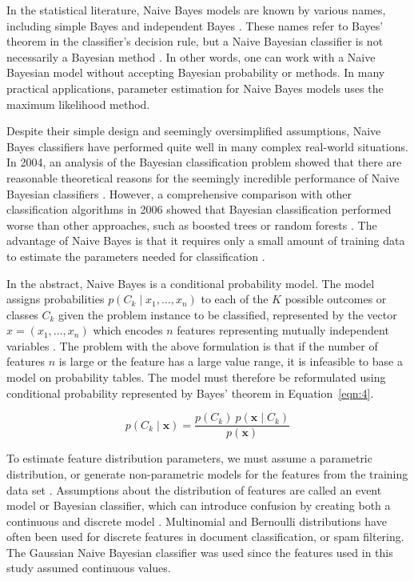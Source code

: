 \documentclass[sn-mathphys-num]{sn-jnl}%
\begin{document}
In the statistical literature, Naive Bayes models are known by various names, including simple Bayes and independent Bayes \cite{Hand2001}. These names refer to Bayes' theorem in the classifier's decision rule, but a Naive Bayesian classifier is not necessarily a Bayesian method \cite{Russell1999, Hand2001}. In other words, one can work with a Naive Bayesian model without accepting Bayesian probability or methods. In many practical applications, parameter estimation for Naive Bayes models uses the maximum likelihood method.

Despite their simple design and seemingly oversimplified assumptions, Naive Bayes classifiers have performed quite well in many complex real-world situations. In 2004, an analysis of the Bayesian classification problem showed that there are reasonable theoretical reasons for the seemingly incredible performance of Naive Bayesian classifiers \cite{Zhang2004}. However, a comprehensive comparison with other classification algorithms in 2006 showed that Bayesian classification performed worse than other approaches, such as boosted trees or random forests \cite{Caruana2006}. The advantage of Naive Bayes is that it requires only a small amount of training data to estimate the parameters needed for classification \cite{stackexchange}.

In the abstract, Naive Bayes is a conditional probability model. The model assigns probabilities $p(C_{k}\mid x_{1},\ldots, x_{n})$ to each of the $K$ possible outcomes or classes $C_{k}$ given the problem instance to be classified, represented by the vector $x = (x_{1},\ldots, x_{n})$ which encodes $n$ features representing mutually independent variables \cite{Murty2011}. The problem with the above formulation is that if the number of features $n$ is large or the feature has a large value range, it is infeasible to base a model on probability tables. The model must therefore be reformulated using conditional probability represented by Bayes' theorem in Equation~\ref{eqn:4}.

\begin{equation}
	p(C_{k}\mid \mathbf{x})={\frac{p(C_{k})\ p(\mathbf{x} \mid C_{k})}{p(\mathbf{x})}}
	\label{eqn:4}
\end{equation}

To estimate feature distribution parameters, we must assume a parametric distribution, or generate non-parametric models for the features from the training data set \cite{John2013}. Assumptions about the distribution of features are called an event model or Bayesian classifier, which can introduce confusion by creating both a continuous and discrete model \cite{Mccallum2001, Metsis2006}. Multinomial and Bernoulli distributions have often been used for discrete features in document classification, or spam filtering. The Gaussian Naive Bayesian classifier was used since the features used in this study assumed continuous values.
\end{document}
